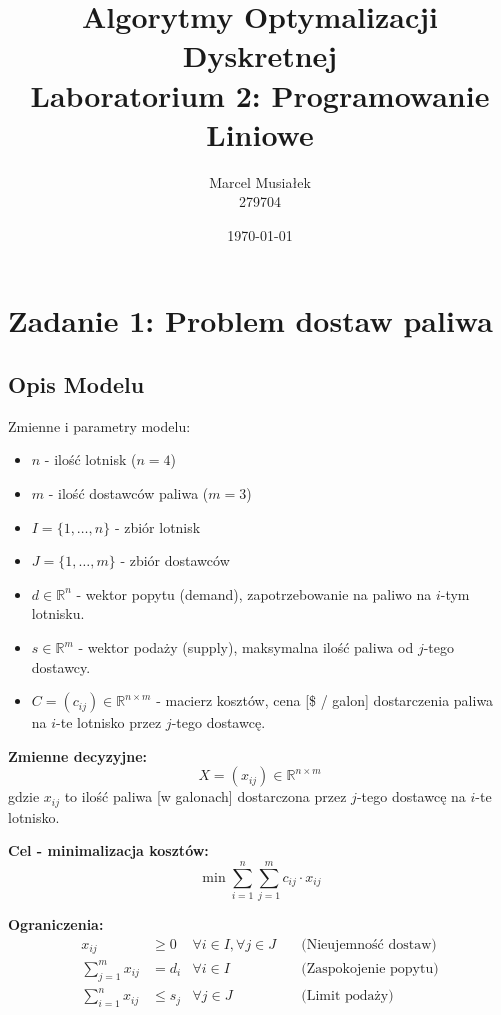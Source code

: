 \documentclass[11pt, a4paper]{article}
\title{Algorytmy Optymalizacji Dyskretnej \\ Laboratorium 2: Programowanie Liniowe}
\author{Marcel Musiałek \\ 279704}
\date{\today}
\begin{document}
\maketitle

\tableofcontents
\newpage

%
%

\section{Zadanie 1: Problem dostaw paliwa}

\subsection{Opis Modelu}
Zmienne i parametry modelu:

\begin{itemize}
    \item $n$ - ilość lotnisk ($n=4$)
    \item $m$ - ilość dostawców paliwa ($m=3$)
    \item $I = \{1, \dots, n\}$ - zbiór lotnisk
    \item $J = \{1, \dots, m\}$ - zbiór dostawców
    \item $d \in \mathbb{R}^n$ - wektor popytu (demand), zapotrzebowanie na paliwo na $i$-tym lotnisku.
    \item $s \in \mathbb{R}^m$ - wektor podaży (supply), maksymalna ilość paliwa od $j$-tego dostawcy.
    \item $C = (c_{ij}) \in \mathbb{R}^{n \times m}$ - macierz kosztów, cena [\$ / galon] dostarczenia paliwa na $i$-te lotnisko przez $j$-tego dostawcę.
\end{itemize}

\noindent \textbf{Zmienne decyzyjne:}
$$ X = (x_{ij}) \in \mathbb{R}^{n \times m} $$
gdzie $x_{ij}$ to ilość paliwa [w galonach] dostarczona przez $j$-tego dostawcę na $i$-te lotnisko.

\noindent \textbf{Cel - minimalizacja kosztów:}
$$ \min \sum_{i=1}^{n} \sum_{j=1}^{m} c_{ij} \cdot x_{ij} $$

\noindent \textbf{Ograniczenia:}
\begin{align*}
    x_{ij} &\ge 0 & \forall i \in I, \forall j \in J \quad &\text{(Nieujemność dostaw)} \\
    \sum_{j=1}^{m} x_{ij} &= d_i & \forall i \in I \quad &\text{(Zaspokojenie popytu)} \\
    \sum_{i=1}^{n} x_{ij} &\le s_j & \forall j \in J \quad &\text{(Limit podaży)}
\end{align*}
\end{document}
